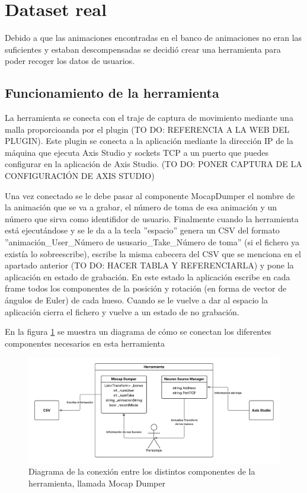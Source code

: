 \section{Dataset real}
\label{sec:datasetReal}
Debido a que las animaciones encontradas en el banco de animaciones no eran las suficientes y estaban descompensadas se decidió crear una herramienta para poder recoger los datos de usuarios.

\subsection{Funcionamiento de la herramienta}
La herramienta se conecta con el traje de captura de movimiento mediante una malla proporcioanda por el plugin (TO DO: REFERENCIA A LA WEB DEL PLUGIN).
Este plugin se conecta a la aplicación mediante la dirección IP de la máquina que ejecuta Axis Studio y sockets TCP a un puerto que puedes configurar en la aplicación de Axis Studio. (TO DO: PONER CAPTURA DE LA CONFIGURACIÓN DE AXIS STUDIO)

Una vez conectado se le debe pasar al componente MocapDumper el nombre de la animación que se va a grabar, el número de toma de esa animación y un número que sirva como identifidor de usuario.
Finalmente cuando la herramienta está ejecutándose y se le da a la tecla ''espacio'' genera un CSV del formato ''animación\_User\_Número de ususario\_Take\_Número de toma'' (si el fichero ya existía lo sobreescribe), escribe la misma cabecera del CSV que se menciona en el apartado anterior (TO DO: HACER TABLA Y REFERENCIARLA) y pone la aplicación en estado de grabación.
En este estado la aplicación escribe en cada frame todos los componentes de la posición y rotación (en forma de vector de ángulos de Euler) de cada hueso.
Cuando se le vuelve a dar al espacio la aplicación cierra el fichero y vuelve a un estado de no grabación.

En la figura \ref{fig:MocapDumper} se muestra un diagrama de cómo se conectan los diferentes componentes necesarios en esta herramienta

\begin{figure}[H]
	\centering
	\includegraphics[width=1\textwidth]{Imagenes/Vectorial/MocapDumper.pdf}
	\caption{Diagrama de la conexión entre los distintos componentes de la herramienta, llamada Mocap Dumper}
	\label{fig:MocapDumper}
\end{figure}

